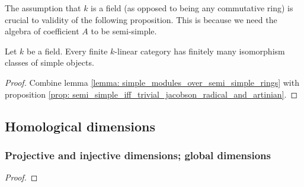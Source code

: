             \begin{remark}
                The assumption that $k$ is a field (as opposed to being any commutative ring) is crucial to validity of the following proposition. This is because we need the algebra of coefficient $A$ to be semi-simple. 
            \end{remark}
            \begin{proposition} \label{prop: simple_objects_in_finite_linear_categories}
                Let $k$ be a field. Every finite $k$-linear category has finitely many isomorphism classes of simple objects. 
            \end{proposition}
                \begin{proof}
                    Combine lemma \ref{lemma: simple_modules_over_semi_simple_rings} with proposition \ref{prop: semi_simple_iff_trivial_jacobson_radical_and_artinian}.
                \end{proof}
        
    \subsection{Homological dimensions}
        \subsubsection{Projective and injective dimensions; global dimensions}
            \begin{lemma} \label{lemma: schaunel_lemma}
                \cite[\href{https://stacks.math.columbia.edu/tag/00O3}{Tag 00O3}]{stacks}
            \end{lemma}
                \begin{proof}
                    
                \end{proof}
        

